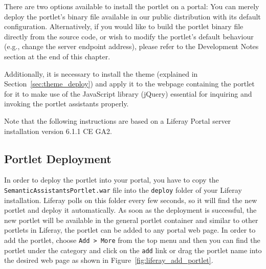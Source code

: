 There are two options available to install the \sa portlet on a portal: You can merely deploy the portlet's binary file available in our public distribution with its default configuration. Alternatively, if you would like to build the portlet binary file directly from the source code, or wish to modify the portlet's default behaviour (e.g., change the \sa server endpoint address), please refer to the Development Notes section at the end of this chapter.

Additionally, it is necessary to install the \sa theme (explained in Section~\ref{sec:theme_deploy}) and apply it to the webpage containing the \sa portlet for it to make use of the JavaScript library (jQuery) essential for inquiring and invoking the \sa portlet assistants properly. 

Note that the following instructions are based on a Liferay Portal server installation version 6.1.1 CE GA2. 

\subsection{\sa Portlet Deployment}
In order to deploy the \sa portlet into your portal, you have to copy the \texttt{SemanticAssistantsPortlet.war} file into the \texttt{deploy} folder of your Liferay installation. Liferay polls on this folder every few seconds, so it will find the new portlet and deploy it automatically. As soon as the deployment is successful, the new portlet will be available in the general portlet container and similar to other portlets in Liferay, the \sa portlet can be added to any portal web page. In order to add the \sa portlet, choose \texttt{Add \textgreater~More} from the top menu and then you can find the portlet under the \sa category and click on the \texttt{add} link or drag the portlet name into the desired web page as shown in Figure~\ref{fig:liferay_add_portlet}.

